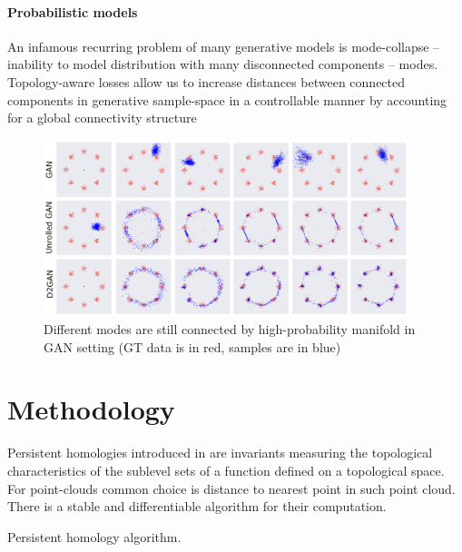 \subsubsection{Probabilistic models}
An infamous recurring problem of many generative models is mode-collapse -- inability to model distribution with many disconnected components -- modes. Topology-aware losses allow us to increase distances between connected components in generative sample-space in a controllable manner by accounting for a global connectivity structure
\begin{figure}[h]
\centering

  \includegraphics[width=0.95\textwidth]{images/modecollapse.png}
  \caption{Different modes are still connected by high-probability manifold in GAN setting (GT data is in red, samples are in blue)}
  \label{fig:modecollapse}

\end{figure}

\chapter{Methodology}
Persistent homologies introduced in \cite{Bar94} are invariants measuring the topological characteristics of the sublevel sets of a function defined on a topological space. For point-clouds common choice is distance to nearest point in such point cloud. There is a stable and differentiable algorithm for their computation.

\begin{algorithm}[h!]
\SetAlgoLined
{}
\caption{Persistent homology algorithm.}
\label{algo:ph}
\end{algorithm}

